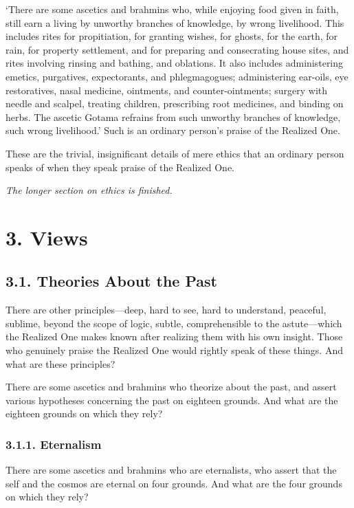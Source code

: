 \documentclass[12pt,openany]{book}%
\newcommand*{\scendsection}[1]{\begin{center}\textit{#1}\end{center}}
\begin{document}
‘There are some ascetics and brahmins who, while enjoying food given in faith, still earn a living by unworthy branches of knowledge, by wrong livelihood. This includes rites for propitiation, for granting wishes, for ghosts, for the earth, for rain, for property settlement, and for preparing and consecrating house sites, and rites involving rinsing and bathing, and oblations. It also includes administering emetics, purgatives, expectorants, and phlegmagogues; administering ear-oils, eye restoratives, nasal medicine, ointments, and counter-ointments; surgery with needle and scalpel, treating children, prescribing root medicines, and binding on herbs. The ascetic Gotama refrains from such unworthy branches of knowledge, such wrong livelihood.’ Such is an ordinary person’s praise of the Realized One. 

These are the trivial, insignificant details of mere ethics that an ordinary person speaks of when they speak praise of the Realized One. 

\scendsection{The longer section on ethics is finished. }

\section*{3. Views }

\subsection*{3.1. Theories About the Past }

There are other principles—deep, hard to see, hard to understand, peaceful, sublime, beyond the scope of logic, subtle, comprehensible to the astute—which the Realized One makes known after realizing them with his own insight. Those who genuinely praise the Realized One would rightly speak of these things. And what are these principles? 

There are some ascetics and brahmins who theorize about the past, and assert various hypotheses concerning the past on eighteen grounds. And what are the eighteen grounds on which they rely? 

\subsubsection*{3.1.1. Eternalism }

There are some ascetics and brahmins who are eternalists, who assert that the self and the cosmos are eternal on four grounds. And what are the four grounds on which they rely? 
\end{document}

